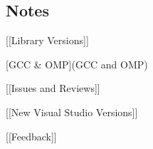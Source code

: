 \subsection*{Notes}


\begin{DoxyItemize}
\item \mbox{[}\mbox{[}Library Versions\mbox{]}\mbox{]}
\item \mbox{[}G\-C\-C \& O\-M\-P\mbox{]}(G\-C\-C and O\-M\-P)
\item \mbox{[}\mbox{[}Issues and Reviews\mbox{]}\mbox{]}
\item \mbox{[}\mbox{[}New Visual Studio Versions\mbox{]}\mbox{]}
\item \mbox{[}\mbox{[}Feedback\mbox{]}\mbox{]} 
\end{DoxyItemize}